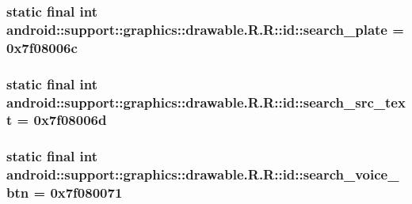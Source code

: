 \hypertarget{classandroid_1_1support_1_1graphics_1_1drawable_1_1_r_1_1id_a60693bbea38b03375c2e948ed3e1dda}{
\subsubsection[{search\_\-plate}]{\setlength{\rightskip}{0pt plus 5cm}static final int android::support::graphics::drawable.R.R::id::search\_\-plate = 0x7f08006c}}
\label{classandroid_1_1support_1_1graphics_1_1drawable_1_1_r_1_1id_a60693bbea38b03375c2e948ed3e1dda}


\hypertarget{classandroid_1_1support_1_1graphics_1_1drawable_1_1_r_1_1id_7b9bba2075435c1819cb164bf998298f}{
\subsubsection[{search\_\-src\_\-text}]{\setlength{\rightskip}{0pt plus 5cm}static final int android::support::graphics::drawable.R.R::id::search\_\-src\_\-text = 0x7f08006d}}
\label{classandroid_1_1support_1_1graphics_1_1drawable_1_1_r_1_1id_7b9bba2075435c1819cb164bf998298f}


\hypertarget{classandroid_1_1support_1_1graphics_1_1drawable_1_1_r_1_1id_e3c86dd7f64b67c81242df8af4977620}{
\subsubsection[{search\_\-voice\_\-btn}]{\setlength{\rightskip}{0pt plus 5cm}static final int android::support::graphics::drawable.R.R::id::search\_\-voice\_\-btn = 0x7f080071}}
\label{classandroid_1_1support_1_1graphics_1_1drawable_1_1_r_1_1id_e3c86dd7f64b67c81242df8af4977620}


